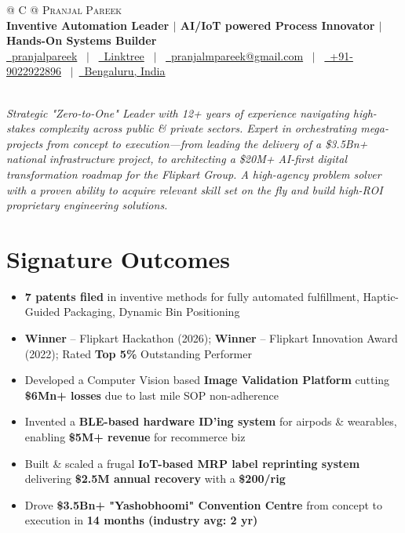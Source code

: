 \documentclass[a4paper,10.5in,13pt]{article}
\begin{document}
\pagestyle{empty} 

\begin{tabularx}{\linewidth}{@{} C @{}}
\Huge{\textsc{Pranjal Pareek}} \\[5pt]
\textbf{Inventive Automation Leader $|$ AI/IoT powered Process Innovator
 $|$ Hands-On Systems Builder}\\[5pt]
\href{https://linkedin.com/in/pranjalpareek}{\raisebox{-0.05\height}\faLinkedin\ pranjalpareek} \ $|$ \ 
\href{https://linktr.ee/pranjalpareek}{\raisebox{-0.05\height}\faGlobe \ Linktree} \ $|$ \ 
\href{mailto:pranjalmpareek@gmail.com}{\raisebox{-0.05\height}\faEnvelope \ pranjalmpareek@gmail.com} \ $|$ \ 
\href{tel:+919022922896}{\raisebox{-0.05\height}\faMobile \ +91-9022922896} \ $|$\
\href{tel:+919022922896}{\raisebox{-0.05\height}\faMapMarker \ Bengaluru, India}
\end{tabularx}

\hrulefill \\
\textit{Strategic "Zero-to-One" Leader with 12+ years of experience navigating high-stakes complexity across public \& private sectors. Expert in orchestrating mega-projects from concept to execution—from leading the delivery of a \$3.5Bn+ national infrastructure project, to architecting a \$20M+ AI-first digital transformation roadmap for the Flipkart Group. A high-agency problem solver with a proven ability to acquire relevant skill set on the fly and build high-ROI proprietary engineering solutions.}

\section{Signature Outcomes}
\begin{itemize}[leftmargin=0.5em,label={--},itemsep=0pt,topsep=0pt,parsep=0pt,partopsep=0pt]
    \item \textbf{7 patents filed} in inventive methods for fully automated fulfillment, Haptic-Guided Packaging, Dynamic Bin Positioning
    \item  \textbf{Winner} – Flipkart Hackathon (2026); \textbf{Winner} – Flipkart Innovation Award (2022); Rated \textbf{Top 5\%} Outstanding Performer
    \item Developed a Computer Vision based \textbf{Image Validation Platform} cutting \textbf{\$6Mn+ losses} due to last mile SOP non-adherence
    \item Invented a \textbf{BLE-based hardware ID'ing system} for airpods \& wearables, enabling \textbf{\$5M+ revenue} for recommerce biz
    \item Built \& scaled a frugal \textbf{IoT-based MRP label reprinting system} delivering \textbf{\$2.5M annual recovery} with a \textbf{\$200/rig}
    \item Drove \textbf{\$3.5Bn+ "Yashobhoomi" Convention Centre} from concept to execution in \textbf{14 months (industry avg: 2 yr)}
\end{itemize}
\end{document}
